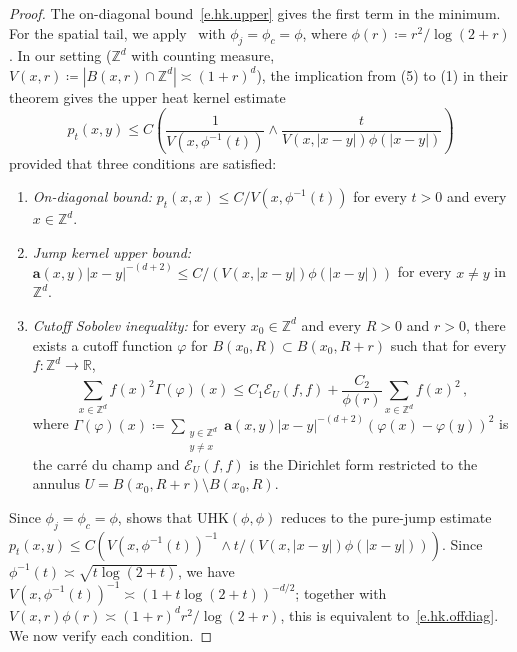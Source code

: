 \documentclass[11pt]{amsart}
\theoremstyle{plain}
\theoremstyle{definition}
\theoremstyle{remark}
\newcommand{\Zd}{\mathbb{Z}^d}
\newcommand{\R}{\mathbb{R}}
\renewcommand{\a}{\mathbf{a}}
\begin{document}
	\begin{proof}
		The on-diagonal bound~\eqref{e.hk.upper} gives the first term in the minimum.
		For the spatial tail, we apply~\cite[Theorem~1.12]{ChenKumagaiWang2019} with $\phi_j = \phi_c = \phi$, where $\phi(r) \coloneqq r^2/\log(2{+}r)$.
		In our setting ($\Zd$ with counting measure, $V(x,r) \coloneqq |B(x,r) \cap \Zd| \asymp (1+r)^d$), the implication from (5) to (1) in their theorem gives the upper heat kernel estimate
		\[
		p_t(x,y) \le C\left(\frac{1}{V(x,\phi^{-1}(t))} \wedge \frac{t}{V(x,|x-y|)\phi(|x-y|)}\right)
		\]
		provided that three conditions are satisfied:
		\begin{enumerate}
			\item[\textup{(i)}] \emph{On-diagonal bound:} $p_t(x,x) \le C/V(x,\phi^{-1}(t))$ for every $t > 0$ and every $x \in \Zd$.
			\item[\textup{(ii)}] \emph{Jump kernel upper bound:} $\a(x,y)|x{-}y|^{-(d+2)} \le C/(V(x,|x-y|)\phi(|x-y|))$ for every $x \ne y$ in $\Zd$.
			\item[\textup{(iii)}] \emph{Cutoff Sobolev inequality:} for every $x_0 \in \Zd$ and every $R > 0$ and $r > 0$, there exists a cutoff function $\varphi$ for $B(x_0,R) \subset B(x_0,R{+}r)$ such that for every $f \colon \Zd \to \R$,
			\[
			\sum_{x \in \Zd}f(x)^2\Gamma(\varphi)(x) \le C_1\mathcal{E}_U(f,f) + \frac{C_2}{\phi(r)}\sum_{x \in \Zd}f(x)^2\,,
			\]
			where $\Gamma(\varphi)(x) \coloneqq \sum_{\substack{y \in \Zd \\ y \ne x}}\a(x,y)|x{-}y|^{-(d+2)}(\varphi(x) - \varphi(y))^2$ is the carr\'e du champ and $\mathcal{E}_U(f,f)$ is the Dirichlet form restricted to the annulus $U = B(x_0,R{+}r) \setminus B(x_0,R)$.
		\end{enumerate}
		Since $\phi_j = \phi_c = \phi$, \cite[Remark~1.16(ii)]{ChenKumagaiWang2019} shows that $\mathrm{UHK}(\phi,\phi)$ reduces to the pure-jump estimate $p_t(x,y) \le C(V(x,\phi^{-1}(t))^{-1} \wedge t/(V(x,|x-y|)\phi(|x-y|)))$.
		Since $\phi^{-1}(t) \asymp \sqrt{t\log(2{+}t)}$, we have $V(x,\phi^{-1}(t))^{-1} \asymp (1 + t\log(2+t))^{-d/2}$; together with $V(x,r)\phi(r) \asymp (1+r)^d r^2 / \log(2{+}r)$, this is equivalent to~\eqref{e.hk.offdiag}.
		We now verify each condition.
		

\end{proof}
\end{document}
